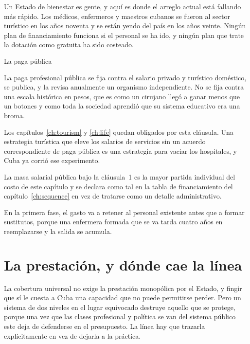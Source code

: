 Un Estado de bienestar es gente, y aquí es donde el arreglo actual está fallando más
rápido. Los médicos, enfermeros y maestros cubanos se fueron al sector turístico en los
años noventa y se están yendo del país en los años veinte. Ningún plan de financiamiento
funciona si el personal se ha ido, y ningún plan que trate la dotación como gratuita ha
sido costeado.

\begin{design}{La paga pública}
\label{d:pay}
\begin{rules}
 La paga profesional pública se fija contra el salario privado y
turístico doméstico, se publica, y la revisa anualmente un organismo independiente. No
se fija contra una escala histórica en pesos, que es como un cirujano llegó a ganar
menos que un botones y como toda la sociedad aprendió que su sistema educativo era una
broma.

 Los capítulos~\ref{ch:tourism} y \ref{ch:life} quedan obligados por
esta cláusula. Una estrategia turística que eleve los salarios de servicios sin un
acuerdo correspondiente de paga pública es una estrategia para vaciar los hospitales, y
Cuba ya corrió ese experimento.

 La masa salarial pública bajo la cláusula~1 es la mayor partida
individual del costo de este capítulo y se declara como tal en la tabla de
financiamiento del capítulo~\ref{ch:sequence} en vez de tratarse como un detalle
administrativo.

 En la primera fase, el gasto va a retener al personal
existente antes que a formar sustitutos, porque una enfermera formada que se va tarda
cuatro años en reemplazarse y la salida se acumula.
\end{rules}
\end{design}

\section{La prestación, y dónde cae la línea}

La cobertura universal no exige la prestación monopólica por el Estado, y fingir que sí
le cuesta a Cuba una capacidad que no puede permitirse perder. Pero un sistema de dos
niveles en el lugar equivocado destruye aquello que se protege, porque una vez que las
clases profesional y política se van del sistema público este deja de defenderse en el
presupuesto. La línea hay que trazarla explícitamente en vez de dejarla a la práctica.


